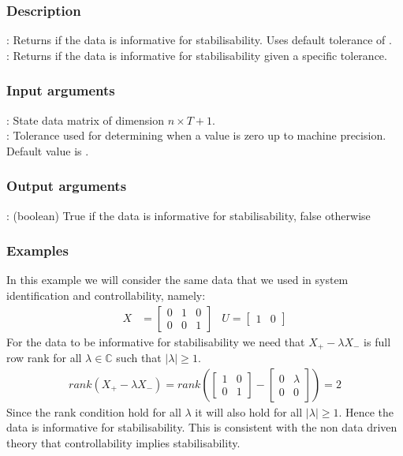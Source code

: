 \subsubsection*{Description}
: Returns if the data is informative for stabilisability. Uses default tolerance of .\\
: Returns if the data is informative for stabilisability given a specific tolerance.  

\subsubsection*{Input arguments}
\textbf{}: State data matrix of dimension $n \times T+1$.\\
\textbf{}: Tolerance used for determining when a value is zero up to machine precision. Default value is .

\subsubsection*{Output arguments}
\textbf{}: (boolean) True if the data is informative for stabilisability, false otherwise\\

\subsubsection{Examples}
In this example we will consider the same data that we used in system identification and controllability, namely:
\begin{align*}
X &= \begin{bmatrix} 0&1&0 \\ 0&0&1 \end{bmatrix} & U = \begin{bmatrix}	1&0	\end{bmatrix}
\end{align*} 
For the data to be informative for stabilisability we need that $X_+ - \lambda X_-$ is full row rank for all $\lambda \in \mathbb{C}$ such that $|\lambda| \geq 1$.
\begin{align*}
rank(X_+ - \lambda X_-) = rank\left(\begin{bmatrix} 1&0\\0&1\end{bmatrix} - \begin{bmatrix} 0&\lambda\\0&0\end{bmatrix}\right) = 2
\end{align*}
Since the rank condition hold for all $\lambda$ it will also hold for all $|\lambda| \geq 1$. Hence the data is informative for stabilisability. This is consistent with the non data driven theory that controllability implies stabilisability. 

